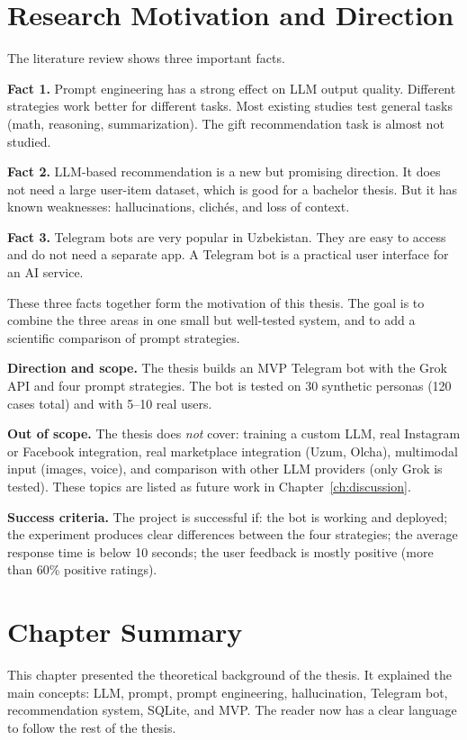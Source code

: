 \section{Research Motivation and Direction}
\label{sec:motivation}

The literature review shows three important facts.

\textbf{Fact 1.} Prompt engineering has a strong effect on LLM output quality. Different strategies work better for different tasks. Most existing studies test general tasks (math, reasoning, summarization). The gift recommendation task is almost not studied.

\textbf{Fact 2.} LLM-based recommendation is a new but promising direction. It does not need a large user-item dataset, which is good for a bachelor thesis. But it has known weaknesses: hallucinations, clichés, and loss of context.

\textbf{Fact 3.} Telegram bots are very popular in Uzbekistan. They are easy to access and do not need a separate app. A Telegram bot is a practical user interface for an AI service.

These three facts together form the motivation of this thesis. The goal is to combine the three areas in one small but well-tested system, and to add a scientific comparison of prompt strategies.

\textbf{Direction and scope.} The thesis builds an MVP Telegram bot with the Grok API and four prompt strategies. The bot is tested on 30 synthetic personas (120 cases total) and with 5--10 real users.

\textbf{Out of scope.} The thesis does \textit{not} cover: training a custom LLM, real Instagram or Facebook integration, real marketplace integration (Uzum, Olcha), multimodal input (images, voice), and comparison with other LLM providers (only Grok is tested). These topics are listed as future work in Chapter~\ref{ch:discussion}.

\textbf{Success criteria.} The project is successful if: the bot is working and deployed; the experiment produces clear differences between the four strategies; the average response time is below 10 seconds; the user feedback is mostly positive (more than 60\% positive ratings).

\section{Chapter Summary}
\label{sec:ch1-summary}

This chapter presented the theoretical background of the thesis. It explained the main concepts: LLM, prompt, prompt engineering, hallucination, Telegram bot, recommendation system, SQLite, and MVP. The reader now has a clear language to follow the rest of the thesis.

